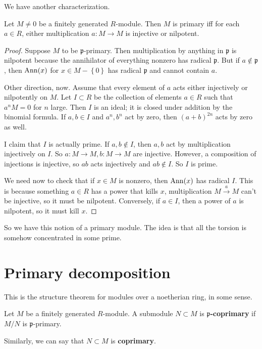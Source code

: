 We have another characterization.

\begin{proposition}
Let $M \neq 0$ be a finitely generated $R$-module. Then $M$ is primary iff for each $a \in
R$, either multiplication $a: M \to M$ is injective or nilpotent.
\end{proposition}
\begin{proof} 
Suppose $M$ to be $\mathfrak{p}$-primary. Then multiplication by anything in
$\mathfrak{p}$ is nilpotent because the annihilator of everything nonzero has
radical $\mathfrak{p}$. But if $a \notin \mathfrak{p}$, then $\mathrm{Ann}(x)$ for
$x \in M - \left\{0\right\}$ has radical $\mathfrak{p}$ and cannot contain $a$. 

Other direction, now. Assume that every element of $a$ acts either injectively or nilpotently on $M$.
Let $I \subset R$ be the collection of elements $a \in R$ such that $a^n M = 0$
for $n$ large. Then $I$ is an ideal; it is closed under addition by the
binomial formula. If $a, b \in I$ and $a^n, b^n$ act by zero, then $(a+b)^{2n}$
acts by zero as well.


I claim that $I$ is actually prime. If $a,b \notin I$, then $a,b$ act by
multiplication injectively on $I$. So $a: M \to M, b: M \to M$ are injective.
However, a composition of injections is injective, so $ab$ acts injectively and
$ab \notin I$. So $I$ is prime.

We need now to check that if $x \in M$ is nonzero, then $\mathrm{Ann}(x)$ has radical
$I$. This is because something $a \in R$ has a power that kills $x$,
multiplication $M \stackrel{a}{\to} M$ can't be injective, so it must be
nilpotent. Conversely, if $a \in I$, then a power of $a$ is nilpotent, so it
must kill $x$. 
\end{proof} 

So we have this notion of a primary module. The idea is that all the torsion is
somehow concentrated in some prime.

\section{Primary decomposition} This is the structure theorem for modules
over a noetherian ring, in some sense.

\begin{definition} 
Let $M$ be a finitely generated $R$-module. A submodule $N \subset M$ is
\textbf{$\mathfrak{p}$-coprimary} if $M/N$ is $\mathfrak{p}$-primary.

Similarly, we can say that $N \subset M$ is \textbf{coprimary}.
\end{definition} 

